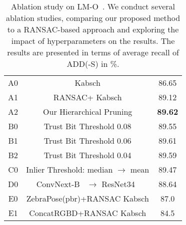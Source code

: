 \begin{table}
  \centering
  \begin{tabular}{@{}c|c|c@{}}
    \toprule
     A0 &Kabsch& 86.65 \\
     A1 &RANSAC+ Kabsch& 89.12 \\
     A2 &Our Hierarchical Pruning &\textbf{89.62}\\
     \midrule
     B0 &Trust Bit Threshold 0.08& 89.55 \\
     B1 &Trust Bit Threshold 0.06& 89.61 \\
     B2 &Trust Bit Threshold 0.04& 89.59 \\
     \midrule
     C0 &Inlier Threshold: median $\rightarrow$ mean & 89.47 \\
     \midrule
     D0 & ConvNext-B~\cite{Liu2022ACF} $\rightarrow$ ResNet34~\cite{He2015DeepRL} & 88.64 \\
     \midrule
     E0 & ZebraPose(pbr)+RANSAC Kabsch&87.0\\
     E1 & ConcatRGBD+RANSAC Kabsch&84.5\\
    \bottomrule
  \end{tabular}
  \caption{Ablation study on LM-O~\cite{Brachmann2016UncertaintyDriven6P}. We conduct several ablation studies, comparing our proposed method to a RANSAC-based approach and exploring the impact of hyperparameters on the results. The results are presented in terms of average recall of ADD(-S) in \%.}
  \label{tab:ablation_study}
\end{table}
